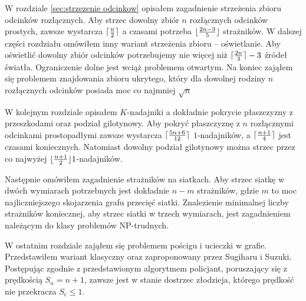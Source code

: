 \documentclass[brudnopis]{xmgr}
\DeclarePairedDelimiter\ceil{\lceil}{\rceil}
\DeclarePairedDelimiter\floor{\lfloor}{\rfloor}
\theoremstyle{definition}
\begin{document}
W rozdziale \ref{sec:strzezenie odcinkow} opisałem zagadnienie strzeżenia zbioru odcinków rozłącznych.
Aby strzec dowolny zbiór $n$ rozłącznych odcinków prostych, zawsze wystarcza $\ceil{\frac{n}{2}}$ a czasami potrzeba $\floor{\frac{2n-3}{5}}$ strażników. W dalszej części rozdziału omówiłem inny wariant strzeżenia zbioru -- oświetlanie. Aby oświetlić dowolny zbiór odcinków potrzebujemy nie więcej niż $\ceil{\frac{2n}{3}} - 3$ źródeł światła. Ograniczenie dolne jest wciąż problemem otwartym. Na koniec zająłem  się problemem znajdowania zbioru ukrytego, który dla dowolnej rodziny $n$ rozłącznych odcinków posiada moc co najmniej $\sqrt{n}$

W kolejnym rozdziale opisałem $K$-nadajniki a dokładnie pokrycie płaszczyzny z przeszkodami oraz podział gilotynowy. Aby pokryć płaszczyznę z $n$ rozłącznymi odcinkami prostopadłymi zawsze wystarcza $\ceil{\frac{5n+6}{12}}$ $1$-nadajników, a $\ceil{\frac{n+1}{4}}$ jest czasami koniecznych. Natomiast dowolny podział gilotynowy można strzec przez co najwyżej $\floor{\frac{n+1}{2}} 1$-nadajników.

Następnie omówiłem zagadnienie strażników na siatkach. Aby strzec siatkę w dwóch wymiarach potrzebnych jest dokładnie $n - m$ strażników, gdzie $m$ to moc najliczniejszego skojarzenia grafu przecięć siatki. Znalezienie minimalnej liczby strażników koniecznej, aby strzec siatki w trzech wymiarach, jest zagadnieniem należącym do klasy problemów NP-trudnych.

W ostatnim rozdziale zająłem się problemem pościgu i ucieczki w grafie. Przedstawiłem wariant klasyczny oraz zaproponowany przez Sugiharu i Suzuki. Postępując zgodnie z przedstawionym algorytmem policjant, poruszający się z prędkością $S_n = n + 1$, zawsze jest w stanie dostrzec złodzieja, którego prędkość nie przekracza $S_c \leq 1$. 

\appendix
\end{document}
